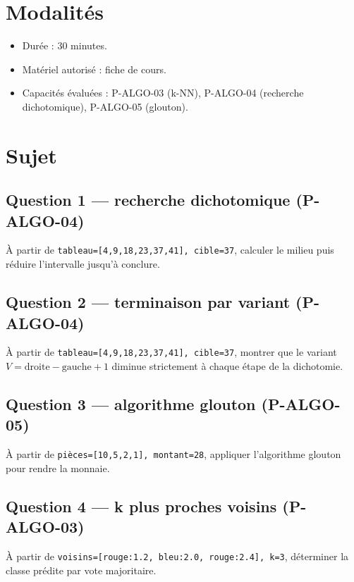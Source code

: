 \documentclass[a4paper,11pt]{article}
\begin{document}

\section*{Modalités}
\begin{itemize}[nosep]
  \item Durée : 30 minutes.
  \item Matériel autorisé : fiche de cours.
  \item Capacités évaluées : P-ALGO-03 (k-NN), P-ALGO-04 (recherche dichotomique), P-ALGO-05 (glouton).
\end{itemize}

\section*{Sujet}

\subsection*{Question 1 — recherche dichotomique (P-ALGO-04)}
À partir de \texttt{tableau=[4,9,18,23,37,41], cible=37}, calculer le milieu puis réduire l'intervalle
jusqu'à conclure.

\subsection*{Question 2 — terminaison par variant (P-ALGO-04)}
À partir de \texttt{tableau=[4,9,18,23,37,41], cible=37}, montrer que le variant
$V = \text{droite} - \text{gauche} + 1$ diminue strictement à chaque étape de la dichotomie.

\subsection*{Question 3 — algorithme glouton (P-ALGO-05)}
À partir de \texttt{pièces=[10,5,2,1], montant=28}, appliquer l'algorithme glouton pour rendre la monnaie.

\subsection*{Question 4 — k plus proches voisins (P-ALGO-03)}
À partir de \texttt{voisins=[rouge:1.2, bleu:2.0, rouge:2.4], k=3}, déterminer la classe prédite
par vote majoritaire.
\end{document}
